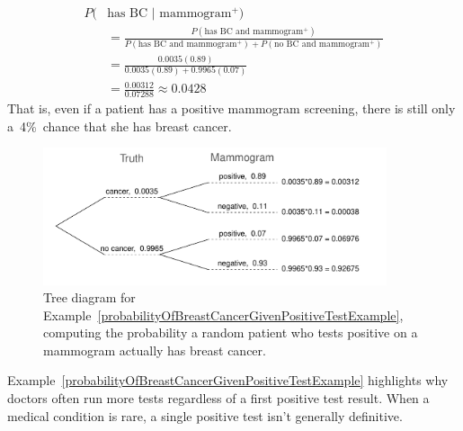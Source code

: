 \begin{example}
\begin{align*}
P(&\text{has BC $|$ mammogram$^+$}) \\
&= \frac{P(\text{has BC and mammogram$^+$})}{P(\text{has BC and mammogram$^+$}) +  P(\text{no BC and mammogram$^+$})} \\
&= \frac{0.0035(0.89)}{0.0035(0.89)+0.9965(0.07)}\\
&= \frac{0.00312}{0.07288}\approx 0.0428
\end{align*}
That is, even if a patient has a positive mammogram screening, there is still only a~4\%~chance that she has breast cancer.
\end{example}

\begin{figure}[ht]
\centering
\includegraphics[width=0.9\textwidth]{ch_probability/figures/BreastCancerTreeDiagram/BreastCancerTreeDiagram}
\caption{Tree diagram for Example~\ref{probabilityOfBreastCancerGivenPositiveTestExample}, computing the probability a random patient who tests positive on a mammogram actually has breast cancer.}
\label{BreastCancerTreeDiagram}
\end{figure}

Example~\ref{probabilityOfBreastCancerGivenPositiveTestExample} highlights why doctors often run more tests regardless of a first positive test result. When a medical condition is rare, a single positive test isn't generally definitive.

